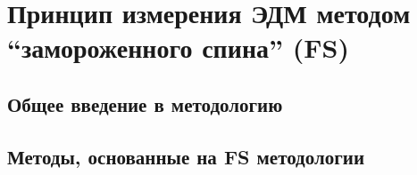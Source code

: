 \chapter{Принцип измерения ЭДМ методом ``замороженного спина'' (FS)}

\section{Общее введение в методологию}


\section{Методы, основанные на FS методологии}

